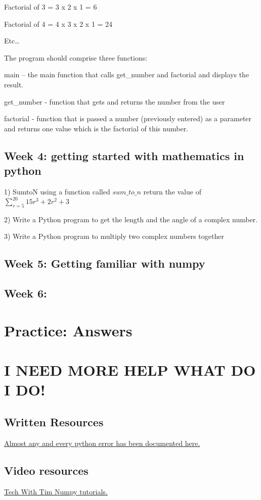 \documentclass{article}
\begin{document}
	 Factorial of  3 = 3 x 2 x 1 = 6 
	 
	 Factorial of  4 = 4 x 3 x 2 x 1 = 24 
	 
	 Etc… 
	 
	 The program should comprise three functions: 
	 
	 main – the main function that calls get\_number and factorial and displays the result.  
	 
	 get\_number -  function that gets and returns the number from the user 
	 
	 factorial - function that is passed a number (previously entered) as a parameter and returns one value which is the factorial of this number. 
	 
	 \subsection{Week 4: getting started with mathematics in python}
	 1) SumtoN using a function called $sum\_to\_n$ return the value of $\sum^{20}_{r=5}{15r^{3} + 2{r^2} + 3}$
	 
	 2) Write a Python program to get the length and the angle of a complex number.
	 
	 3) Write a Python program to multiply two complex numbers together
	 \subsection{Week 5: Getting familiar with numpy}
	 
	 \subsection{Week 6:}
	  
	 
	 
	\section{Practice: Answers}
	
	\section{I NEED MORE HELP WHAT DO I DO!}
	\subsection{Written Resources}
	\newline
	\href{https://stackoverflow.com/}{Almost any and every python error has been documented here.}
	\subsection{Video resources}
	 \newline
	\href{https://www.youtube.com/watch?v=biLz7KPgHJA&list=PLzMcBGfZo4-ksMuZFqH5LBytux1_p7bcx}{Tech With Tim Numpy tutorials.}
	
	
	
	
\end{document}
